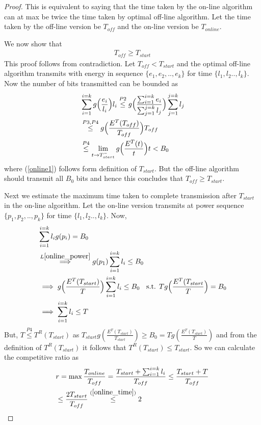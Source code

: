 \begin{proof}
This is equivalent to saying that the time taken by the on-line algorithm can at max be twice the time taken by optimal off-line algorithm. Let the time taken by the off-line version be $T_{off}$ and the on-line version be $T_{online}$. 

We now show that 
\begin{align}
T_{off}\ge T_{start}
\label{online_time}
\end{align}
This proof follows from contradiction. Let $T_{off}<T_{start}$ and the optimal off-line algorithm transmits with energy in sequence $\{e_1,e_2,..,e_k\}$ for time $\{l_1,l_2..,l_k\} $. Now the number of bits transmitted can be bounded as
\begin{align}
&\sum_{i=1}^{i=k} g\Big{(}\frac{e_i}{l_i}\Big{)}l_i\stackrel{P2}{\le} g\Big{(}\frac{\sum_{i=1}^{i=k}e_i}{\sum_{j=1}^{j=k}l_j}\Big{)} \sum_{j=1}^{j=k} l_j 
\\
&\stackrel{P3,P4}{\le} g\Big{(}\frac{E^T(T_{off})}{T_{off}}\Big{)} T_{off}
\\
&\stackrel{P4}{\le}\lim_{t \rightarrow T_{start}^{-}} g\Big{(}\frac{E^T(t)}{t}\Big{)} t < B_0 \label{online1}
\end{align}
where (\ref{online1}) follows form definition of $T_{start}$. But the off-line algorithm should transmit all $B_0$ bits and hence this concludes that $T_{off}\ge T_{start}$.

Next we estimate the maximum time taken to complete transmission after $T_{start}$ in the on-line algorithm. Let the on-line version transmits at power sequence $\{p_1,p_2,..,p_k\}$ for time $\{l_1,l_2..,l_k\} $. Now,
\begin{align}
&\sum_{i=1}^{i=k}l_ig(p_i)=B_0
\\
&\stackrel{L\ref{online_power}}{\implies}g(p_1)\sum_{i=1}^{i=k}l_i\le B_0
\\
&\implies g\Big{(}\frac{E^T(T_{start})}{T}\Big{)}\sum_{i=1}^{i=k}l_i\le B_0 \text{\hspace{2mm}  s.t. } Tg\Big{(}\frac{E^T(T_{start}}{T}\Big{)}=B_0
\\
&\implies \sum_{i=1}^{i=k}l_i \le T
\end{align}
But, $T\stackrel{P4}{\le} T^R(T_{start})$ as $T_{start}g(\frac{E^T(T_{start})}{T_{start}})\ge B_0=Tg(\frac{E^T(T_{start})}{T})$ and from the definition of $T^R(T_{start})$ it follows that $T^R(T_{start})\le T_{start}$. So we can calculate the competitive ratio as
\begin{align}
&r=\max\dfrac{T_{online}}{T_{off}} = \dfrac{T_{start}+\sum_{i=1}^{i=k}l_i}{T_{off}} \le  \dfrac{T_{start}+T}{T_{off}} 
\\
&\le \dfrac{2 T_{start}}{T_{off}} \stackrel{(\ref{online_time})}{\le} 2
\end{align}      
\end{proof}